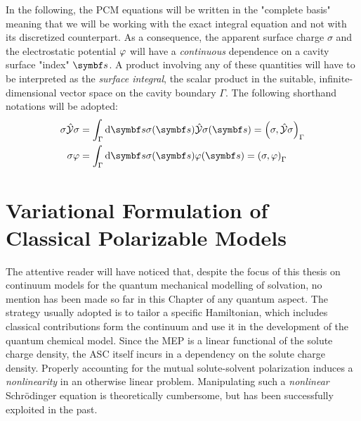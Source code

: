In the following, the \acrshort{PCM} equations will be written in the
"complete basis" meaning that we will be working with the exact integral
equation and not with its discretized counterpart.
As a consequence, the apparent surface charge $\sigma$ and
the electrostatic potential $\varphi$ will have a \emph{continuous}
dependence on a cavity surface "index" $\vect{s}$.
A product involving any of these quantities will have to be
interpreted as the \emph{surface integral}, \ie the scalar product in
the suitable, infinite-dimensional vector space on the cavity boundary
$\Gamma$.
The following shorthand notations will be adopted:
\begin{equation}
  \begin{aligned}
  \sigma\PCM\sigma &=
  \int_\Gamma\diff\vect{s}\sigma(\vect{s})\PCM\sigma(\vect{s})
  =
  \scalprod{\sigma}{\PCM\sigma} \\
  \sigma\esp &=
  \int_\Gamma\diff\vect{s}\sigma(\vect{s})\esp(\vect{s})
  =
  \scalprod{\sigma}{\esp}
  \end{aligned}
\end{equation}

\section[Variational Formulation of Classical Polarizable Models]{
Variational Formulation of Classical Polarizable Models}
\label{sec:variational}

The attentive reader will have noticed that, despite the focus of this
thesis on continuum models for the quantum mechanical modelling of
solvation, no mention has been made so far in this Chapter of any
quantum aspect.
The strategy usually adopted is to tailor a specific Hamiltonian, which
includes classical contributions form the continuum and use it in the
development of the quantum chemical model.
Since the \acrshort{MEP} is a linear functional of the solute charge density,
the \acrshort{ASC} itself incurs in a dependency on the solute charge
density.
Properly accounting for the mutual solute-solvent polarization induces a
\emph{nonlinearity} in an otherwise linear problem.
Manipulating such a \emph{nonlinear} Schr\"{o}dinger equation is
theoretically cumbersome,\autocite{Sanhueza1979-bp, Heimsoeth1990-ki}
but has been successfully exploited in the past.\autocite{Tomasi2005-vm}

